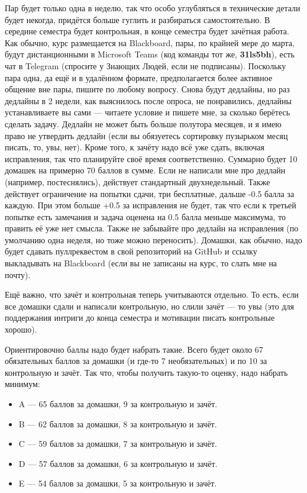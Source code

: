 \documentclass[a5paper]{article}
\begin{document}
Пар будет только одна в неделю, так что особо углубляться в технические детали будет некогда, придётся больше гуглить и разбираться самостоятельно. В середине семестра будет контрольная, в конце семестра будет зачётная работа. Как обычно, курс размещается на Blackboard, пары, по крайней мере до марта, будут дистанционными в Microsoft Teams (код команды тот же, \textbf{31ls5bh}), есть чат в Telegram (спросите у Знающих Людей, если не подписаны). Поскольку пара одна, да ещё и в удалённом формате, предполагается более активное общение вне пары, пишите по любому вопросу. Снова будут дедлайны, но раз дедлайны в 2 недели, как выяснилось после опроса, не понравились, дедлайны устанавливаете вы сами --- читаете условие и пишете мне, за сколько берётесь сделать задачу. Дедлайн не может быть больше полутора месяцев, и я имею право не утвердить дедлайн (если вы обязуетесь сортировку пузырьком месяц писать, то, увы, нет). Кроме того, к зачёту надо всё уже сдать, включая исправления, так что планируйте своё время соответственно. Суммарно будет 10 домашек на примерно 70 баллов в сумме. Если не написали мне про дедлайн (например, постеснялись), действует стандартный двухнедельный. Также действует ограничение на попытки сдачи, три бесплатные, дальше -0.5 балла за каждую. При этом больше +0.5 за исправления не будет, так что если к третьей попытке есть замечания и задача оценена на 0.5 балла меньше максимума, то править её уже нет смысла. Также не забывайте про дедлайн на исправления (по умолчанию одна неделя, но тоже можно переносить). Домашки, как обычно, надо будет сдавать пуллреквестом в свой репозиторий на GitHub и ссылку выкладывать на Blackboard (если вы не записаны на курс, то слать мне на почту).

Ещё важно, что зачёт и контрольная теперь учитываются отдельно. То есть, если все домашки сдали и написали контрольную, но слили зачёт --- то увы (это для поддержания интриги до конца семестра и мотивации писать контрольные хорошо).

Ориентировочно баллы надо будет набрать такие. Всего будет около 67 обязательных баллов за домашки (и где-то 7 необязательных) и по 10 за контрольную и зачёт. Так что, чтобы получить такую-то оценку, надо набрать минимум:
\begin{itemize}
    \item A --- 65 баллов за домашки, 9 за контрольную и зачёт.
    \item B --- 62 баллов за домашки, 8 за контрольную и зачёт.
    \item C --- 59 баллов за домашки, 7 за контрольную и зачёт.
    \item D --- 57 баллов за домашки, 6 за контрольную и зачёт.
    \item E --- 54 баллов за домашки, 5 за контрольную и зачёт.
\end{itemize}
\end{document}
